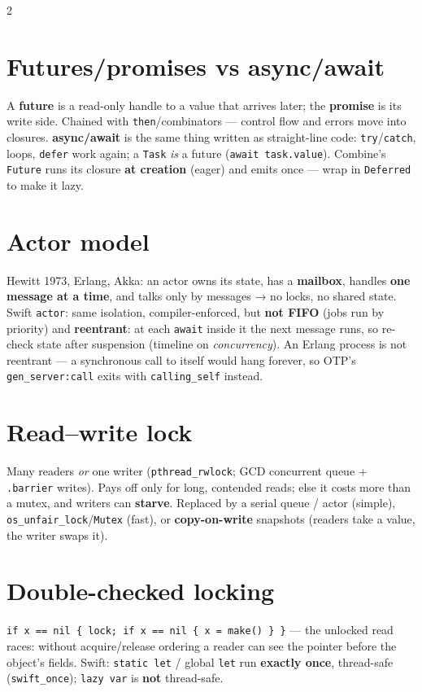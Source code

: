 \documentclass[8pt]{extarticle}
\newcommand\ct[1]{\texttt{#1}}
\newcommand\eqeq{\hbox{=}\hbox{=}}   %
\begin{document}
\begin{multicols}{2}
\section{Futures/promises vs async/await}
A \textbf{future} is a read-only handle to a value that arrives later; the
\textbf{promise} is its write side. Chained with \ct{then}/combinators —
control flow and errors move into closures. \textbf{async/await} is the same
thing written as straight-line code: \ct{try}/\ct{catch}, loops, \ct{defer}
work again; a \ct{Task} \emph{is} a future (\ct{await task.value}). Combine's
\ct{Future} runs its closure \textbf{at creation} (eager) and emits once —
wrap in \ct{Deferred} to make it lazy.

\section{Actor model}
Hewitt 1973, Erlang, Akka: an actor owns its state, has a \textbf{mailbox},
handles \textbf{one message at a time}, and talks only by messages → no locks,
no shared state. Swift \ct{actor}: same isolation, compiler-enforced, but
\textbf{not FIFO} (jobs run by priority) and \textbf{reentrant}: at each
\ct{await} inside it the next message runs, so re-check state after
suspension (timeline on \emph{concurrency}). An Erlang process is not
reentrant — a synchronous call to itself would hang forever, so OTP's
\ct{gen\_server:call} exits with \ct{calling\_self} instead.

\section{Read–write lock}
Many readers \emph{or} one writer (\ct{pthread\_rwlock}; GCD concurrent queue +
\ct{.barrier} writes). Pays off only for long, contended reads; else it costs
more than a mutex, and writers can \textbf{starve}. Replaced by a serial queue /
actor (simple), \ct{os\_unfair\_lock}/\ct{Mutex} (fast), or
\textbf{copy-on-write} snapshots (readers take a value, the writer swaps it).

\section{Double-checked locking}
\ct{if x \eqeq{} nil \{ lock; if x \eqeq{} nil \{ x = make() \} \}} — the
unlocked read races: without acquire/release ordering a reader can see the
pointer before the object's fields. Swift: \ct{static let} / global \ct{let}
run \textbf{exactly once}, thread-safe (\ct{swift\_once}); \ct{lazy var} is
\textbf{not} thread-safe.


\end{multicols}
\end{document}
